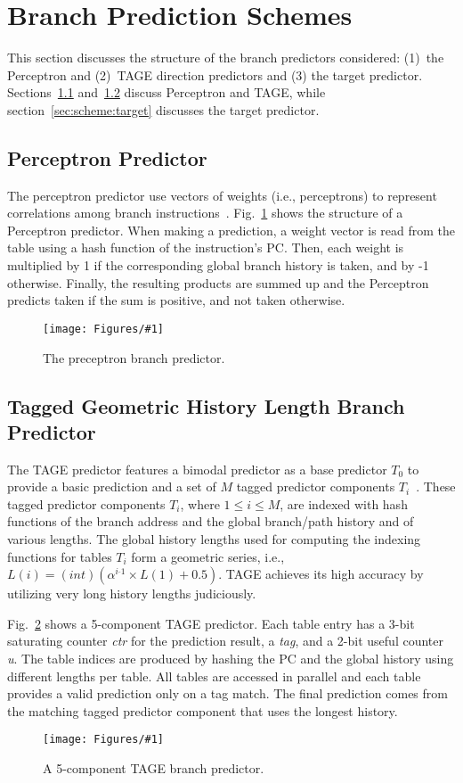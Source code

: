 \documentclass[conference]{IEEEtran}
\newcommand{\kfig}[4]{ %
        \begin{figure}[!t]
        \centering
        \texttt{[image: Figures/\#1]}
        \vspace{-1mm}
        \caption{#3}
        \label{#2}
        \end{figure}
}
\begin{document}
\section{Branch Prediction Schemes}
\label{sec:scheme}
This section discusses the structure of the branch predictors considered: (1)\ the Perceptron and (2)\ TAGE direction predictors and (3) the target predictor. Sections~\ref{sec:scheme:perceptron} and~\ref{sec:scheme:tage} discuss Perceptron and TAGE, while section~\ref{sec:scheme:target} discusses the target predictor.

\subsection{Perceptron Predictor}
\label{sec:scheme:perceptron}
The perceptron predictor use vectors of weights (i.e., perceptrons) to represent correlations among branch instructions~\cite{perceptron}. Fig.~\ref{fig:perceptron} shows the structure of a Perceptron predictor. When making a prediction, a weight vector is read from the table using a hash function of the instruction's PC. Then, each weight is multiplied by 1 if the corresponding global branch history is taken, and by -1 otherwise. Finally, the resulting products are summed up and the Perceptron predicts taken if the sum is positive, and not taken otherwise.
\kfig{perceptron.pdf}{fig:perceptron}{The preceptron branch predictor.}{angle = 0, trim = 1in 3.5in 2in 1in, clip, width=0.4\textwidth}

\subsection{Tagged Geometric History Length Branch Predictor}
\label{sec:scheme:tage}
The TAGE predictor features a bimodal predictor as a base predictor $T_0$ to provide a basic prediction and a set of $M$ tagged predictor components $T_i$~\cite{tage}. These tagged predictor components $T_i$, where $1\leq i\leq M$, are indexed with hash functions of the branch address and the global branch/path history and of various lengths. The global history lengths used for computing the indexing functions for tables $T_i$ form a geometric series, i.e., $L(i) = (int)(\alpha^{i{}^{\_}1}\times L(1)+0.5)$. TAGE achieves its high accuracy by utilizing very long history lengths judiciously.

Fig.~\ref{fig:tage} shows a 5-component TAGE predictor. Each table entry has a 3-bit saturating counter \textit{ctr} for the prediction result, a \textit{tag}, and a 2-bit useful counter \textit{u}. The table indices are produced by hashing the PC and the global history using different lengths per table. All tables are accessed in parallel and each table provides a valid prediction only on a tag match. The final prediction comes from the matching tagged predictor component that uses the longest history. \kfig{tage.pdf}{fig:tage}{A 5-component TAGE branch predictor.}{angle = 0, trim = 0.6in 0.6in 0.4in 0.2in, clip, width=0.4\textwidth}
\end{document}
